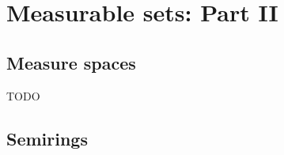 \chapter{Measurable sets: Part II}%
\label{cha:Measurable sets: Part II}
\section{Measure spaces}%
\label{sec:Measure spaces}

\begin{definition}
    \label{def:5.1}
    TODO
\end{definition}
\section{Semirings}%
\label{sec:Semirings}



